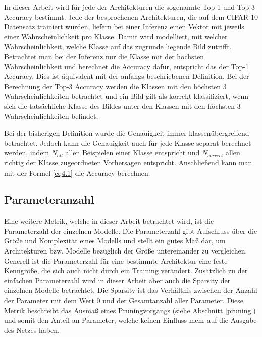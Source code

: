 In dieser Arbeit wird für jede der Architekturen die sogenannte Top-1 und Top-3 Accuracy bestimmt. Jede der besprochenen Architekturen, die auf dem CIFAR-10 Datensatz trainiert wurden, liefern bei einer Inferenz einen Vektor mit jeweils einer Wahrscheinlichkeit pro Klasse. Damit wird modelliert, mit welcher Wahrscheinlichkeit, welche Klasse auf das zugrunde liegende Bild zutrifft. Betrachtet man bei der Inferenz nur die Klasse mit der höchsten Wahrscheinlichkeit und berechnet die Accuracy dafür, entspricht das der Top-1 Accuracy. Dies ist äquivalent mit der anfangs beschriebenen Definition. Bei der Berechnung der Top-3 Accuracy werden die Klassen mit den höchsten 3 Wahrscheinlichkeiten betrachtet und ein Bild gilt als korrekt klassifiziert, wenn sich die tatsächliche Klasse des Bildes unter den Klassen mit den höchsten 3 Wahrscheinlichkeiten befindet.

Bei der bisherigen Definition wurde die Genauigkeit immer klassenübergreifend betrachtet. Jedoch kann die Genauigkeit auch für jede Klasse separat berechnet werden, indem $N_{all}$ allen Beispielen einer Klasse entspricht und $N_{correct}$ allen richtig der Klasse zugeordneten Vorhersagen entspricht. Anschließend kann man mit der Formel \ref{eq4.1} die Accuracy berechnen.


\subsection{Parameteranzahl}
Eine weitere Metrik, welche in dieser Arbeit betrachtet wird, ist die Parameterzahl der einzelnen Modelle. Die Parameterzahl gibt Aufschluss über die Größe und Komplexität eines Modells und stellt ein gutes Maß dar, um Architekturen bzw. Modelle bezüglich der Größe untereinander zu vergleichen. Generell ist die Parameterzahl für eine bestimmte Architektur eine feste Kenngröße, die sich auch nicht durch ein Training verändert. Zusätzlich zu der einfachen Parameterzahl wird in dieser Arbeit aber auch die Sparsity der einzelnen Modelle betrachtet. Die Sparsity ist das Verhältnis zwischen der Anzahl der Parameter mit dem Wert 0 und der Gesamtanzahl aller Parameter. Diese Metrik beschreibt das Ausmaß eines Pruningvorgangs (siehe Abschnitt \ref{pruning}) und somit den Anteil an Parameter, welche keinen Einfluss mehr auf die Ausgabe des Netzes haben.


